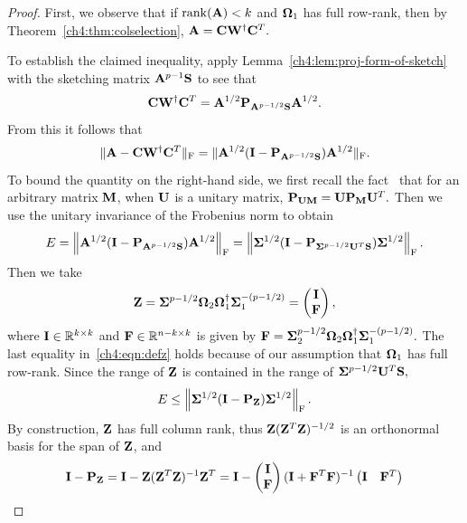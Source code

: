 \begin{proof}
First, we observe that if $\mathrm{rank}(\mathbf{A}) < k$ and $\mathbf{\Omega}_1$ has full row-rank, then by Theorem~\ref{ch4:thm:colselection},
$\mathbf{A} = \mathbf{C}\mathbf{W}^\dagger \mathbf{C}^T.$

To establish the claimed inequality, apply Lemma~\ref{ch4:lem:proj-form-of-sketch} with the sketching matrix
$\mathbf{A}^{p-1} \mathbf{S}$ to see that
\[
 \mathbf{C}\mathbf{W}^\dagger\mathbf{C}^T = \mathbf{A}^{1/2} \mathbf{P}_{\mathbf{A}^{p-1/2} \mathbf{S}} \mathbf{A}^{1/2}.
\]
From this it follows that
\[
\|\mathbf{A} - \mathbf{C} \mathbf{W}^\dagger \mathbf{C}^T\|_{\mathrm{F}}
   = \|\mathbf{A}^{1/2}(\mathbf{I} - \mathbf{P}_{\mathbf{A}^{p-1/2} \mathbf{S}})\mathbf{A}^{1/2}\|_{\mathrm{F}}.
\]
To bound the quantity on the right-hand side, we first 
recall the fact~\cite[Proposition 8.4]{HMT11} that for an 
arbitrary matrix $\mathbf{M}$, when $\mathbf{U}$ is a unitary matrix, 
$\mathbf{P}_{\mathbf{U} \mathbf{M}} = \mathbf{U} \mathbf{P}_{\mathbf{M}} \mathbf{U}^T.$
Then we use the unitary invariance of the Frobenius norm
to obtain
\[
 E = \left\|\mathbf{A}^{1/2}(\mathbf{I} - \mathbf{P}_{\mathbf{A}^{p-1/2} \mathbf{S}})\mathbf{A}^{1/2}\right\|_\mathrm{F} = 
 \left\|\mathbf{\Sigma}^{1/2} (\mathbf{I} - \mathbf{P}_{\mathbf{\Sigma}^{p-1/2} \mathbf{U}^T \mathbf{S}}) \mathbf{\Sigma}^{1/2}\right\|_\mathrm{F}.
\]
Then we take
\begin{equation}
 \mathbf{Z} = \mathbf{\Sigma}^{p-1/2} \mathbf{\Omega}_2 \mathbf{\Omega}_1^\dagger \mathbf{\Sigma}_1^{-(p-1/2)} = \begin{pmatrix} \mathbf{I} \\ \mathbf{F} \end{pmatrix},
 \label{ch4:eqn:defz}
\end{equation}
where $\mathbf{I} \in \mathbb{R}^{k \times k}$ and $\mathbf{F} \in \mathbb{R}^{n-k \times k}$ 
is given by $\mathbf{F} = \mathbf{\Sigma}_2^{p-1/2} \mathbf{\Omega}_2 \mathbf{\Omega}_1^\dagger \mathbf{\Sigma}_1^{-(p-1/2)}.$
The last equality in~\ref{ch4:eqn:defz} holds because of our assumption that $\mathbf{\Omega}_1$ has full row-rank.
Since the range of $\mathbf{Z}$ is contained in the range of $\mathbf{\Sigma}^{p-1/2} \mathbf{U}^T \mathbf{S},$
\[
 E \leq \left\|\mathbf{\Sigma}^{1/2} (\mathbf{I} - \mathbf{P}_{\mathbf{Z}}) \mathbf{\Sigma}^{1/2}\right\|_\mathrm{F}.
\]
By construction, $\mathbf{Z}$ has full column rank, thus $\mathbf{Z}(\mathbf{Z}^T\mathbf{Z})^{-1/2}$
is an orthonormal basis for the span of $\mathbf{Z}$, and
\begin{align}
 \mat{I} - \matP_\matZ & = \mat{I} - \matZ(\matZ\transp\matZ)^{-1}\matZ\transp
   = \mat{I} - \begin{pmatrix} \matI \\ \matF \end{pmatrix}
  (\matI + \matF\transp\matF)^{-1} \begin{pmatrix} \matI & \matF\transp \end{pmatrix} \notag\\

\end{align}
\end{proof}
